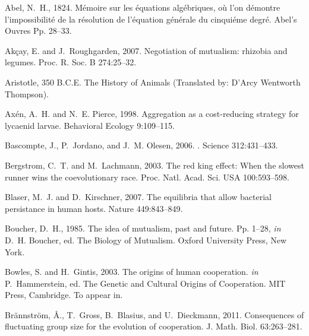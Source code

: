 \documentclass[a4paper]{scrartcl}
\begin{document}
\begin{thebibliography}{58}
\providecommand{\natexlab}[1]{#1}
\providecommand{\url}[1]{\texttt{#1}}
\providecommand{\urlprefix}{URL }

Abel, N.~H., 1824.
\newblock M\'emoire sur les \'equations alg\'ebriques, o\`u l'on d\'emontre
  l'impossibilit\'e de la r\'esolution de l'\'equation g\'en\'erale du
  cinqui\'eme degr\'e.
\newblock Abel's Ouvres Pp. 28--33.

Ak{\c c}ay, E. and J.~Roughgarden, 2007.
\newblock Negotiation of mutualism: rhizobia and legumes.
\newblock Proc. R. Soc. B 274:25--32.

Aristotle, 350 B.C.E.
\newblock The History of Animals (Translated by: D'Arcy Wentworth Thompson).

Ax{\'e}n, A.~H. and N.~E. Pierce, 1998.
\newblock Aggregation as a cost-reducing strategy for lycaenid larvae.
\newblock Behavioral Ecology 9:109--115.

Bascompte, J., P.~Jordano, and J.~M. Olesen, 2006.
.
\newblock Science 312:431--433.

Bergstrom, C.~T. and M.~Lachmann, 2003.
\newblock The red king effect: When the slowest runner wins the coevolutionary
  race.
\newblock Proc. Natl. Acad. Sci. USA 100:593--598.

Blaser, M.~J. and D.~Kirschner, 2007.
\newblock The equilibria that allow bacterial persistance in human hosts.
\newblock Nature 449:843--849.

Boucher, D.~H., 1985.
\newblock The idea of mutualism, past and future.
\newblock Pp. 1--28, \emph{in} D.~H. Boucher, ed. The Biology of Mutualism.
  Oxford University Press, New York.

Bowles, S. and H.~Gintis, 2003.
\newblock The origins of human cooperation.
\newblock \emph{in} P.~Hammerstein, ed. The Genetic and Cultural Origins of
  Cooperation. MIT Press, Cambridge.
\newblock To appear in.

Br{\"a}nnstr{\"o}m, {\AA}., T.~Gross, B.~Blasius, and U.~Dieckmann, 2011.
\newblock Consequences of fluctuating group size for the evolution of
  cooperation.
\newblock J. Math. Biol. 63:263--281.


\end{thebibliography}
\end{document}
